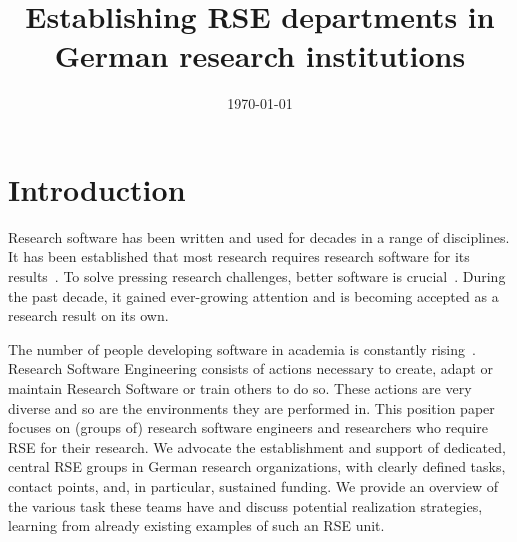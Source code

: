 \documentclass[a4paper]{article}
\title{Establishing RSE departments in German research institutions}
\date{\today}
\begin{document}
\maketitle

\section{Introduction}
Research software has been written and used for decades in a range of disciplines.
It has been established that most research requires research software for its results~\autocite{Hannay2009, Hettrick2015}.
To solve pressing research challenges, better software is crucial~\autocite{Goble2014}.
During the past decade, it gained ever-growing attention and is becoming accepted as a research result on its own.

The number of people developing software in academia is constantly rising~\autocite{Hannay2009, Hettrick2015}.
Research Software Engineering consists of actions necessary to create, adapt or maintain Research Software or train others to do so.
These actions are very diverse and so are the environments they are performed in.
This position paper focuses on (groups of) research software engineers and researchers who require RSE for their research.
We advocate the establishment and support of dedicated, central RSE groups in German research organizations, with clearly defined tasks, contact points, and, in particular, sustained funding.
We provide an overview of the various task these teams have and discuss potential realization strategies, learning from already existing examples of such an RSE unit.
\end{document}
